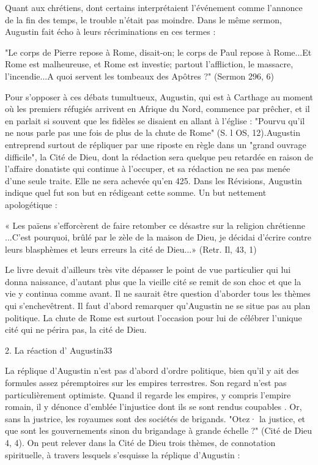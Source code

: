 Quant aux chrétiens, dont certains interprétaient l'événement comme l'annonce de la fin des temps, le trouble n'était pas moindre. Dans le même sermon, Augustin fait écho à leurs récriminations en ces termes :

"Le corps de Pierre repose à Rome, disait-on; le corps de Paul repose à Rome...Et Rome est malheureuse, et Rome est investie; partout l'affliction, le massacre, l'incendie...A quoi servent les tombeaux des Apôtres ?" (Sermon 296, 6)

Pour s'opposer à ces débats tumultueux, Augustin, qui est à Carthage au moment où les premiers réfugiés arrivent en Afrique du Nord, commence par prêcher, et il en parlait si souvent que les fidèles se disaient en allant à l'église : "Pourvu qu'il ne nous parle pas une fois de plus de la chute de Rome" (S. l OS, 12).Augustin entreprend surtout de répliquer par une riposte en règle dans un "grand ouvrage difficile", la Cité de Dieu, dont la rédaction sera quelque peu retardée en raison de l'affaire donatiste qui continue à l'occuper, et sa rédaction ne sea pas menée d'une seule traite. Elle ne sera achevée qu'en 425. Dans les Révisions, Augustin indique quel fut son but en rédigeant cette somme. Un but nettement apologétique :

« Les païens s'efforcèrent de faire retomber ce désastre sur la religion chrétienne ...C'est pourquoi, brûlé par le zèle de la maison de Dieu, je décidai d'écrire contre leurs blasphèmes et leurs erreurs la cité de Dieu...» (Retr. Il, 43, 1)

Le livre devait d'ailleurs très vite dépasser le point de vue particulier qui lui donna naissance, d'autant plus que la vieille cité se remit de son choc et que la vie y continua comme avant. Il ne saurait être question d'aborder tous les thèmes qui s'enchevêtrent. Il faut d'abord remarquer qu'Augustin ne se situe pas au plan politique. La chute de Rome est surtout l'occasion pour lui de célébrer l'unique cité qui ne périra pas, la cité de Dieu.

2.	La réaction d' Augustin33  

La réplique d'Augustin n'est pas d'abord d'ordre politique, bien qu'il y ait des formules assez péremptoires sur les empires terrestres. Son regard n'est pas particulièrement optimiste. Quand il regarde les empires, y compris l'empire romain, il y dénonce d'emblée l'injustice dont ils se sont rendus coupables . Or, sans la justrice, les royaumes sont des sociétés de brigands. "Otez· la justice, et que sont les gouvernements sinon du brigandage à grande échelle ?" (Cité de Dieu 4, 4). On peut relever dans la Cité de Dieu trois thèmes, de connotation spirituelle,  à travers lesquels s'esquisse la réplique d'Augustin :






